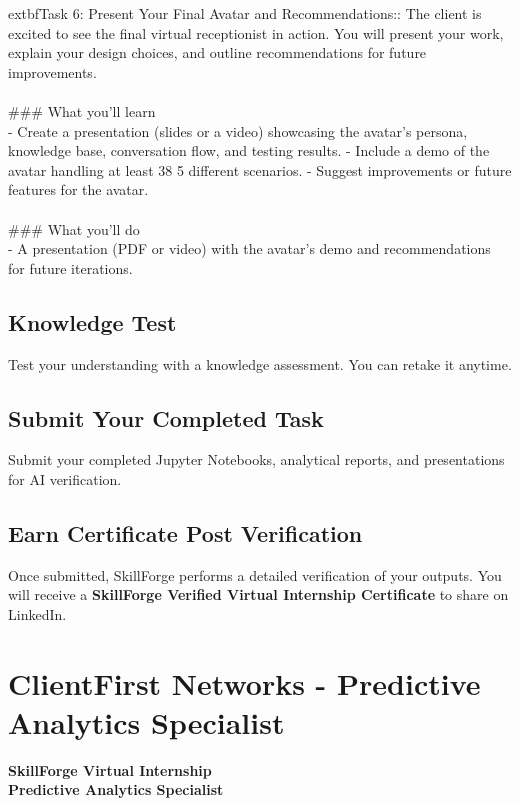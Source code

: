 \documentclass{article}
\begin{document}
	extbf{Task 6:} Present Your Final Avatar and Recommendations:: The client is excited to see the final virtual receptionist in action. You will present your work, explain your design choices, and outline recommendations for future improvements. \\
 \\
### What you'll learn \\
- Create a presentation (slides or a video) showcasing the avatar’s persona, knowledge base, conversation flow, and testing results. - Include a demo of the avatar handling at least 38 5 different scenarios. - Suggest improvements or future features for the avatar. \\
 \\
### What you'll do \\
- A presentation (PDF or video) with the avatar’s demo and recommendations for future iterations.

\subsection*{Knowledge Test}
Test your understanding with a knowledge assessment. You can retake it anytime.\\

\subsection*{Submit Your Completed Task}
Submit your completed Jupyter Notebooks, analytical reports, and presentations for AI verification.\\

\subsection*{Earn Certificate Post Verification}
Once submitted, SkillForge performs a detailed verification of your outputs. You will receive a \textbf{SkillForge Verified Virtual Internship Certificate} to share on LinkedIn.\\

\newpage

\section{ClientFirst Networks - Predictive Analytics Specialist}

\textbf{SkillForge Virtual Internship} \\
\textbf{Predictive Analytics Specialist} \\
\end{document}
